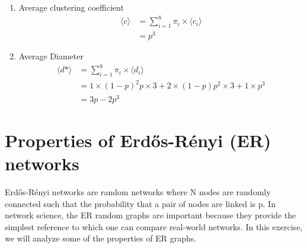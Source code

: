 \documentclass[a4paper,12pt]{article}
\begin{document}
\begin{itemize}
\begin{enumerate}
\item Average clustering coefficient
  \begin{equation}
    \begin{split}
      \langle c \rangle & = \sum_{i=1}^8\pi_i \times \langle c_i \rangle
      \\ & = p^3
    \end{split}
  \end{equation}

\item Average Diameter
  \begin{equation}
    \begin{split}
      \langle d* \rangle & = \sum_{i=1}^8 \pi_i \times \langle d_i \rangle \\
      & = 1 \times (1-p)^2p \times 3 + 2 \times (1-p)p^2 \times 3 + 1 \times p^3\\
      & = 3p - 2p^3
    \end{split}
  \end{equation}
\end{enumerate}
  
\end{itemize}

\section{Properties of Erdős-Rényi (ER) networks}
Erdős-Rényi networks are random networks where N nodes are randomly connected such that
the probability that a pair of nodes are linked is p. In network science, the ER random graphs
are important because they provide the simplest reference to which one can compare real-world
networks. In this exercise, we will analyze some of the properties of ER graphs.
\end{document}
